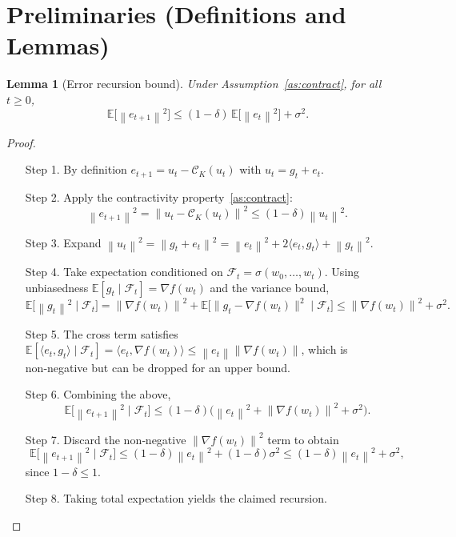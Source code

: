 \documentclass{article}
\newtheorem{lemma}{Lemma}
\newcommand{\E}{\mathbb{E}}
\newcommand{\norm}[1]{\left\lVert #1\right\rVert}
\newcommand{\C}{\mathcal{C}}
\begin{document}
\newpage
\section*{Preliminaries (Definitions and Lemmas)}
\begin{lemma}[Error recursion bound]\label{lem:error-bound}
Under Assumption~\ref{as:contract}, for all $t\ge0$,
\[
    \E\!\bigl[\norm{e_{t+1}}^{2}\bigr]\le (1-\delta)\,\E\!\bigl[\norm{e_{t}}^{2}\bigr]+\sigma^{2}.
\]
\end{lemma}
\begin{proof}
\begin{enumerate}
\item[Step 1.] By definition $e_{t+1}=u_{t}-\C_{K}(u_{t})$ with $u_{t}=g_{t}+e_{t}$.
\item[Step 2.] Apply the contractivity property~\eqref{as:contract}:
\[
    \norm{e_{t+1}}^{2}= \norm{u_{t}-\C_{K}(u_{t})}^{2}
    \le (1-\delta)\norm{u_{t}}^{2}.
\]
\item[Step 3.] Expand $\norm{u_{t}}^{2}= \norm{g_{t}+e_{t}}^{2}
    =\norm{e_{t}}^{2}+2\langle e_{t},g_{t}\rangle+\norm{g_{t}}^{2}$.
\item[Step 4.] Take expectation conditioned on $\mathcal{F}_{t}=\sigma(w_{0},\dots,w_{t})$.
Using unbiasedness $\E[g_{t}\mid\mathcal{F}_{t}]=\nabla f(w_{t})$ and the variance bound,
\[
    \E\bigl[\norm{g_{t}}^{2}\mid\mathcal{F}_{t}\bigr]
    =\norm{\nabla f(w_{t})}^{2}+ \E\bigl[\|g_{t}-\nabla f(w_{t})\|^{2}\mid\mathcal{F}_{t}\bigr]
    \le \norm{\nabla f(w_{t})}^{2}+ \sigma^{2}.
\]
\item[Step 5.] The cross term satisfies $\E[\langle e_{t},g_{t}\rangle\mid\mathcal{F}_{t}]
    =\langle e_{t},\nabla f(w_{t})\rangle\le \norm{e_{t}}\norm{\nabla f(w_{t})}$,
    which is non‑negative but can be dropped for an upper bound.
\item[Step 6.] Combining the above,
\[
    \E\!\bigl[\norm{e_{t+1}}^{2}\mid\mathcal{F}_{t}\bigr]
    \le (1-\delta)\bigl(\norm{e_{t}}^{2}+ \norm{\nabla f(w_{t})}^{2}+ \sigma^{2}\bigr).
\]
\item[Step 7.] Discard the non‑negative $\norm{\nabla f(w_{t})}^{2}$ term to obtain
\[
    \E\!\bigl[\norm{e_{t+1}}^{2}\mid\mathcal{F}_{t}\bigr]
    \le (1-\delta)\norm{e_{t}}^{2}+(1-\delta)\sigma^{2}
    \le (1-\delta)\norm{e_{t}}^{2}+ \sigma^{2},
\]
since $1-\delta\le1$.
\item[Step 8.] Taking total expectation yields the claimed recursion.
\end{enumerate}
\end{proof}
\end{document}
